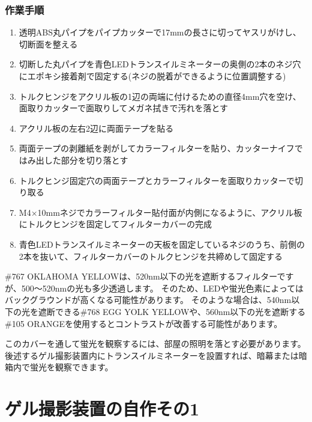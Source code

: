 \documentclass[titlepage,10pt,a4paper,uplatex]{jsbook}
\begin{document}
\subsubsection{作業手順}
\begin{enumerate}
\item 透明ABS丸パイプをパイプカッターで17mmの長さに切ってヤスリがけし、切断面を整える
\item 切断した丸パイプを青色LEDトランスイルミネーターの奥側の2本のネジ穴にエポキシ接着剤で固定する(ネジの脱着ができるように位置調整する)
\item トルクヒンジをアクリル板の1辺の両端に付けるための直径4mm穴を空け、面取りカッターで面取りしてメガネ拭きで汚れを落とす
\item アクリル板の左右2辺に両面テープを貼る
\item 両面テープの剥離紙を剥がしてカラーフィルターを貼り、カッターナイフではみ出した部分を切り落とす
\item トルクヒンジ固定穴の両面テープとカラーフィルターを面取りカッターで切り取る
\item M4×10mmネジでカラーフィルター貼付面が内側になるように、アクリル板にトルクヒンジを固定してフィルターカバーの完成
\item 青色LEDトランスイルミネーターの天板を固定しているネジのうち、前側の2本を抜いて、フィルターカバーのトルクヒンジを共締めして固定する
\end{enumerate}

\#767 OKLAHOMA YELLOWは、520nm以下の光を遮断するフィルターですが、500～520nmの光も多少透過します。
そのため、LEDや蛍光色素によってはバックグラウンドが高くなる可能性があります。
そのような場合は、540nm以下の光を遮断できる\#768 EGG YOLK YELLOWや、560nm以下の光を遮断する\#105 ORANGEを使用するとコントラストが改善する可能性があります。

このカバーを通して蛍光を観察するには、部屋の照明を落とす必要があります。
後述するゲル撮影装置内にトランスイルミネーターを設置すれば、暗幕または暗箱内で蛍光を観察できます。

\section{ゲル撮影装置の自作その1}\label{makinggelimager1}
\end{document}
